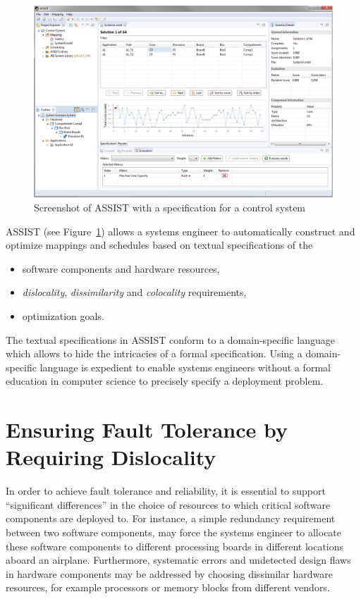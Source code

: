 \documentclass[english,biblatex]{lni}
\begin{document}
\begin{figure}[htbp]
\centering
\includegraphics[width=\textwidth]{assist-screenshot}
\caption{Screenshot of ASSIST with a specification for a control system}
\label{tool}
\end{figure}

ASSIST (see Figure~\ref{tool}) allows a systems engineer to automatically construct and optimize mappings and schedules based on textual specifications of the

\begin{itemize}
\item software components and hardware resources,
\item \textit{dislocality}, \textit{dissimilarity} and \textit{colocality} requirements,
\item optimization goals.
\end{itemize}

The textual specifications in ASSIST conform to a domain-specific language which allows to hide the intricacies of a formal specification.
Using a domain-specific language is expedient to enable systems engineers without a formal education in computer science to precisely specify a deployment problem.

\section{Ensuring Fault Tolerance by Requiring Dislocality}

In order to achieve fault tolerance and reliability, it is essential to support ``significant differences'' in the choice of resources to which critical software components are deployed to.
For instance, a simple redundancy requirement between two software components, may force the systems engineer to allocate these software components to different processing boards in different locations aboard an airplane.
Furthermore, systematic errors and undetected design flaws in hardware components may be addressed by choosing dissimilar hardware resources, for example processors or memory blocks from different vendors.
\end{document}
